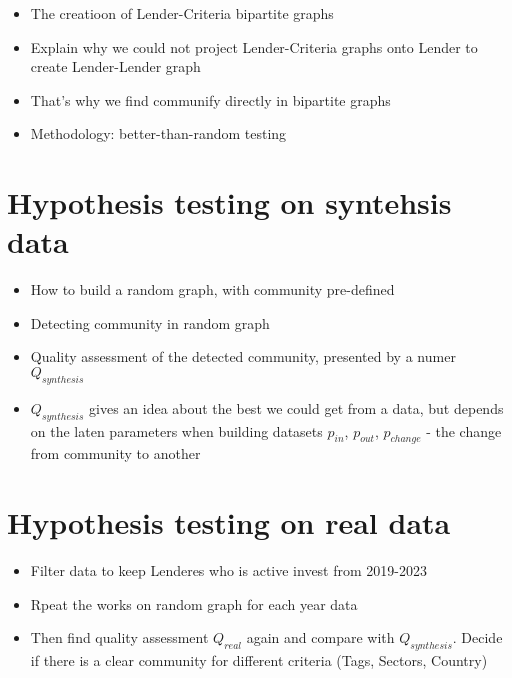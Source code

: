 \begin{itemize}
	\item The creatioon of Lender-Criteria bipartite graphs
	\item Explain why we could not project Lender-Criteria graphs onto Lender to create Lender-Lender graph
	\item That's why we find communify directly in bipartite graphs
	\item Methodology: better-than-random testing
\end{itemize}

\section{Hypothesis testing on syntehsis data}

\begin{itemize}
	\item How to build a random graph, with community pre-defined
	\item Detecting community in random graph
	\item Quality assessment of the detected community, presented by a numer $Q_{synthesis}$
	\item $Q_{synthesis}$ gives an idea about the best we could get from a data, but depends on the laten parameters when building datasets $p_{in}$, $p_{out}$, $p_{change}$ - the change from community to another
\end{itemize}

\section{Hypothesis testing on real data}

\begin{itemize}
	\item Filter data to keep Lenderes who is active invest from 2019-2023
	\item Rpeat the works on random graph for each year data
	\item Then find quality assessment $Q_{real}$ again and compare with $Q_{synthesis}$.
	      Decide if there is a clear community for different criteria (Tags, Sectors, Country)
\end{itemize}